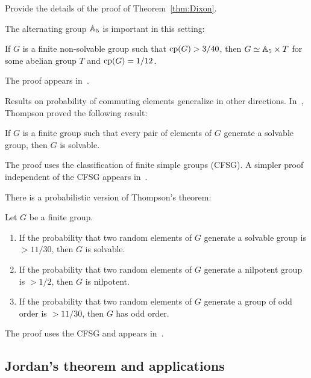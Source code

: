 \begin{bonus}
    Provide the details of the proof of Theorem~\ref{thm:Dixon}.
\end{bonus}

The alternating group $\mathbb{A}_5$ is important in this setting:

\begin{theorem}
    If $G$ is a finite non-solvable group such that $\operatorname{cp}(G)>3/40$, then
    $G\simeq\mathbb{A}_5\times T$ for some abelian group 
    $T$ and $\operatorname{cp}(G)=1/12$. 
\end{theorem}

The proof appears in~\cite{MR2228209}.

Results on probability of commuting elements generalize in other directions. 
In~\cite{MR230809,MR276325,MR313378,MR369512}, 
Thompson proved the following result:

\begin{theorem}[Thompson]
    If $G$ is a finite group such that 
    every pair of elements of $G$ generate
    a solvable group, then $G$ is solvable. 
\end{theorem}

The proof uses the classification of finite simple groups (CFSG). A simpler
proof independent of the CFSG appears in~\cite{MR1346207}.

There is a probabilistic version of Thompson's theorem:

\begin{theorem}
    Let $G$ be a finite group.
    \begin{enumerate}
        \item If the probability that two random elements of $G$ 
        generate a solvable group is $>11/30$, then $G$ is solvable. 
        \item If the probability that two random elements of $G$ 
        generate a nilpotent group is $>1/2$, then $G$ is nilpotent.
        \item If the probability that two random elements of $G$ 
        generate a group of odd order is $>11/30$, then $G$ has odd order.
    \end{enumerate}
\end{theorem}

The proof uses the CFSG and appears in~\cite{MR1770615}.

\subsection{Jordan's theorem and applications}

